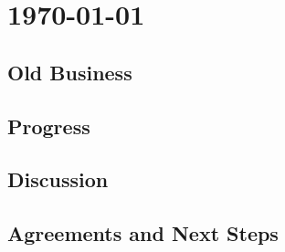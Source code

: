 \documentclass[../document.tex]{subfiles}
\begin{document}

\chapter{1970-01-01}
\section{Old Business}
\section{Progress}
\section{Discussion}
\section{Agreements and Next Steps}

\bib{}
\end{document}
